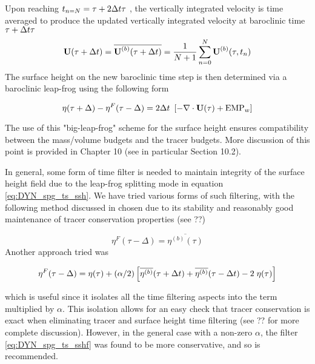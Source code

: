\documentclass[../tex_main/NEMO_manual]{subfiles}
\begin{document}
{Upon reaching $t_{n=N} = \tau + 2\Delta t \tau$ , the vertically integrated velocity is time averaged to produce the updated vertically integrated velocity at baroclinic time $\tau + \Delta t \tau$ 
\begin{equation} \label{eq:DYN_spg_ts_u}
\textbf{U}(\tau+\Delta t) = \overline{\textbf{U}^{(b)}(\tau+\Delta t)} 
 	= \frac{1}{N+1} \sum\limits_{n=0}^N\textbf{U}^{(b)}(\tau,t_{n})
\end{equation}
The surface height on the new baroclinic time step is then determined via a baroclinic leap-frog using the following form 

\begin{equation} \label{eq:DYN_spg_ts_ssh}
\eta(\tau+\Delta) - \eta^{F}(\tau-\Delta) = 2\Delta t \ \left[ - \nabla \cdot \textbf{U}(\tau) + \text{EMP}_w \right]  
\end{equation}

 The use of this "big-leap-frog" scheme for the surface height ensures compatibility between the mass/volume budgets and the tracer budgets. More discussion of this point is provided in Chapter 10 (see in particular Section 10.2). 
 
In general, some form of time filter is needed to maintain integrity of the surface 
height field due to the leap-frog splitting mode in equation \autoref{eq:DYN_spg_ts_ssh}. We 
have tried various forms of such filtering, with the following method discussed in 
\cite{Griffies_al_MWR01} chosen due to its stability and reasonably good maintenance of 
tracer conservation properties (see ??) 

\begin{equation} \label{eq:DYN_spg_ts_sshf}
\eta^{F}(\tau-\Delta) =  \overline{\eta^{(b)}(\tau)} 
\end{equation}
Another approach tried was 

\begin{equation} \label{eq:DYN_spg_ts_sshf2}
\eta^{F}(\tau-\Delta) = \eta(\tau) 
	+ (\alpha/2) \left[\overline{\eta^{(b)}}(\tau+\Delta t)
				    + \overline{\eta^{(b)}}(\tau-\Delta t) -2 \;\eta(\tau) \right]
\end{equation}

which is useful since it isolates all the time filtering aspects into the term multiplied 
by $\alpha$. This isolation allows for an easy check that tracer conservation is exact when 
eliminating tracer and surface height time filtering (see ?? for more complete discussion). However, in the general case with a non-zero $\alpha$, the filter \autoref{eq:DYN_spg_ts_sshf} was found to be more conservative, and so is recommended. 

}            %
\end{document}
